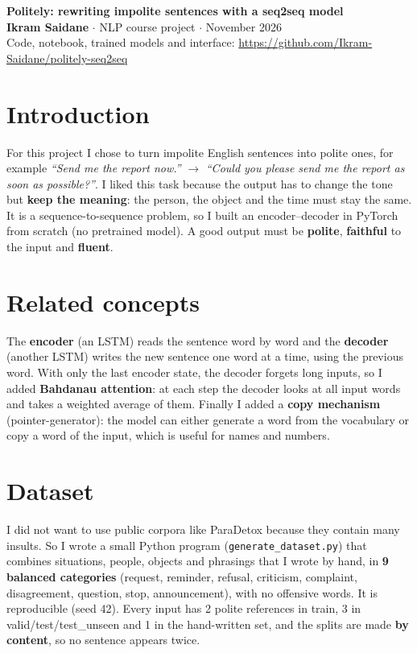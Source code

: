 \documentclass[10pt,a4paper]{article}
\begin{document}
\begin{center}
  {\Large\bfseries Politely: rewriting impolite sentences with a seq2seq model}\\[3pt]
  {\small \textbf{Ikram Saidane} $\cdot$ NLP course project $\cdot$ November 2026\\
  Code, notebook, trained models and interface: \url{https://github.com/Ikram-Saidane/politely-seq2seq}}
\end{center}
\vspace{-6pt}

\section{Introduction}
For this project I chose to turn impolite English sentences into polite ones, for example
\emph{``Send me the report now.''} $\rightarrow$ \emph{``Could you please send me the report as soon as possible?''}.
I liked this task because the output has to change the tone but \textbf{keep the meaning}: the person,
the object and the time must stay the same. It is a sequence-to-sequence problem, so I built an
encoder--decoder in PyTorch from scratch (no pretrained model). A good output must be \textbf{polite},
\textbf{faithful} to the input and \textbf{fluent}.

\section{Related concepts}
The \textbf{encoder} (an LSTM) reads the sentence word by word and the \textbf{decoder} (another LSTM)
writes the new sentence one word at a time, using the previous word. With only the last encoder state,
the decoder forgets long inputs, so I added \textbf{Bahdanau attention}: at each step the decoder looks
at all input words and takes a weighted average of them. Finally I added a \textbf{copy mechanism}
(pointer-generator): the model can either generate a word from the vocabulary or copy a word of the
input, which is useful for names and numbers.

\section{Dataset}
I did not want to use public corpora like ParaDetox because they contain many insults. So I wrote a
small Python program (\texttt{generate\_dataset.py}) that combines situations, people, objects and
phrasings that I wrote by hand, in \textbf{9 balanced categories} (request, reminder, refusal,
criticism, complaint, disagreement, question, stop, announcement), with no offensive words. It is
reproducible (seed 42). Every input has 2 polite references in train, 3 in valid/test/test\_unseen and
1 in the hand-written set, and the splits are made \textbf{by content}, so no sentence appears twice.
\end{document}
